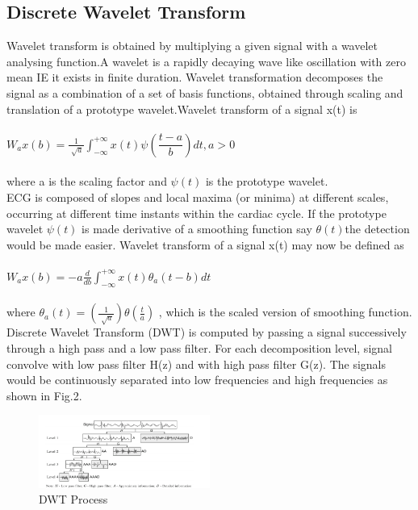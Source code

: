 \documentclass[twocolumn,showpacs,%
  nofootinbib,aps,superscriptaddress,%
  eqsecnum,prd,notitlepage,showkeys,10pt]{revtex4-1}
\begin{document}
\subsection{Discrete Wavelet Transform}
Wavelet transform is obtained by multiplying a given signal with a wavelet analysing function.A wavelet is a rapidly decaying wave like oscillation with zero mean IE it exists in finite duration. Wavelet transformation decomposes the signal as a combination of a set of basis functions, obtained through scaling and translation of a prototype wavelet.Wavelet transform of a signal x(t) is \\ \\
\begin{math}
W_ax(b) = \frac{1}{\sqrt[]{a}}\int_{-\infty}^{+\infty}x(t)\psi \left ( \dfrac{t-a}{b}\right ) dt , a > 0
\end{math}
\\
\\
where a is the scaling factor and \( \psi (t) \) is the prototype wavelet.
\\
ECG is composed of slopes and local maxima (or minima) at different scales, occurring at different time instants within the cardiac cycle. If the prototype wavelet \( \psi (t) \) is made derivative of a smoothing function say \( \theta (t)\)the detection would be made easier. Wavelet transform of a signal x(t) may now be defined as \\ \\
\begin{math}
W_ax(b) = -a \frac{d}{db}\int_{-\infty}^{+\infty} x(t) \theta_a (t-b) dt
\end{math}
\\
\\
where \( \theta_a(t) = \left (\frac{1}{\sqrt[]{a}} \right ) \theta \left ( \frac{t}{a} \right ) \) , which is the scaled version of smoothing function.
\\
Discrete Wavelet Transform (DWT) is computed by passing a signal  successively through a high pass and a low pass filter. For each  decomposition level, signal convolve with low pass filter H(z) and with high pass filter G(z). The signals would be continuously separated into low frequencies and high frequencies as shown in Fig.2.

\begin{figure}
\includegraphics[width=0.5\textwidth]{fig1.png}
\caption{\label{fig:fig1} DWT Process  }
\end{figure}
\end{document}
